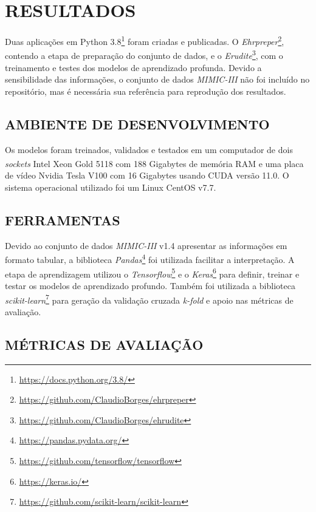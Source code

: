 \chapter{RESULTADOS}
\label{chp:resultados}

Duas aplicações em Python 3.8\footnote{\url{https://docs.python.org/3.8/}} foram criadas e publicadas. O \emph{Ehrpreper}\footnote{\url{https://github.com/ClaudioBorges/ehrpreper}}, contendo a etapa de preparação do conjunto de dados, e o \emph{Erudite}\footnote{\url{https://github.com/ClaudioBorges/ehrudite}}, com o treinamento e testes dos modelos de aprendizado profunda. Devido a sensibilidade das informações, o conjunto de dados \textit{MIMIC-III} não foi incluído no repositório, mas é necessária sua referência para reprodução dos resultados.

\section{AMBIENTE DE DESENVOLVIMENTO}
\label{sec:results-environment}

Os modelos foram treinados, validados e testados em um computador de dois \textit{sockets} Intel\textsuperscript{\textregistered} Xeon\textsuperscript{\textregistered} Gold 5118 com 188 Gigabytes de memória RAM e uma placa de vídeo Nvidia Tesla V100 com 16 Gigabytes usando CUDA versão 11.0. O sistema operacional utilizado foi um Linux CentOS v7.7.

\section{FERRAMENTAS}
\label{sec:results-tools}

Devido ao conjunto de dados \textit{MIMIC-III} v1.4 apresentar as informações em formato tabular, a biblioteca \emph{Pandas}\footnote{\url{https://pandas.pydata.org/}} foi utilizada facilitar a interpretação. A etapa de aprendizagem utilizou o  \emph{Tensorflow}\footnote{\url{https://github.com/tensorflow/tensorflow}} e o \emph{Keras}\footnote{\url{https://keras.io/}} para definir, treinar e testar os modelos de aprendizado profundo. Também foi utilizada a biblioteca  \emph{scikit-learn}\footnote{\url{https://github.com/scikit-learn/scikit-learn}} para geração da validação cruzada \textit{k-fold} e apoio nas métricas de avaliação.

\section{MÉTRICAS DE AVALIAÇÃO}
\label{sec:results-evaluation-metrics}

